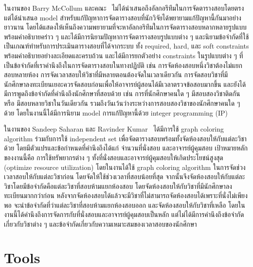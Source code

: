 ในงานของ Barry McCollum และคณะ~\cite{auto-timetable} 
ไม่ได้นำเสนอถึงอัลกอรึทึมในการจัดตารางสอบโดยตรง แต่ได้นำเสนอ model สำหรับแก้ปัญหาการจัดตารางสอบที่นักวิจัยได้พยายามแก้ปัญหานี้กันมาอย่างยาวนาน
โดยได้แสดงให้เห็นถึงความพยายามที่จะหาอัลกอริทึมในการจัดตารางสอบหลากหลายรูปแบบพร้อมคำอธิบายคร่าว ๆ และได้มีการนิยามปัญหาการจัดตารางสอบรูปแบบต่าง ๆ
และนิยามข้อจำกัดที่ใช้เป็นเกณฑ์ทำหรับการประเมินตารางสอบที่ได้จากระบบ ทั้ง required, hard, และ soft constraints พร้อมคำอธิบายอย่างละเอียดและครบถ้วน 
และได้มีการยกตัวอย่าง constraints ในรูปแบบต่าง ๆ ที่เป็นข้อจำกัดที่เราคำนึงถึงในการจัดตารางสอบในทางปฏิบัติ เช่น การจัดห้องสอบหนึ่งวิชาต้องไม่แยกสอบหลายห้อง 
การจัดเวลาสอบให้วิชาที่มีหลายตอนต้องจัดในเวลาเดียวกัน การจัดสอบวิชาที่มีนักศึกษาลงทะเบียนเยอะควรจัดสอบก่อนเพื่อให้อาจารย์ผู้สอนได้มีเวลาตรวจข้อสอบมากขึ้น และยังได้มีการพูดถึงข้อจำกัดที่คำนึงถึงนักศึกษาที่สอบด้วย เช่น การที่นักศึกษาคนใด ๆ มีสอบสองวิชาติดกัน หรือ มีสอบหลายวิชาในวันเดียวกัน 
รวมถึงวันเว้นว่างระหว่างการสอบสองวิชาของนักศึกษาคนใด ๆ ด้วย โดยในงานนี้ได้มีการนิยาม model การแก้ปัญหานี้ด้วย integer programming (IP)

ในงานของ Sandeep Saharan และ Ravinder Kumar~\cite{graphcl-idepset}
ได้มีการใช้ graph coloring algorithm ร่วมกับการใช้ independent set
เพื่อจัดตารางสอบพร้อมทั้งจัดห้องสอบให้กับแต่ละวิชาด้วย โดยมีตัวแปรและข้อกำหนดที่คำนึงถึงได้แก่ จำนวนที่นั่งสอบ และอาจารย์ผู้คุมสอบ
เป้าหมายหลักของงานนี้คือ การใช้ทรัพยากรต่าง ๆ ทั้งที่นั่งสอบและอาจารย์ผู้คุมสอบให้เกิดประโยชน์สูงสุด (optimize resource utilization)
โดยในงานได้ใช้ graph coloring algorithm ในการจัดช่วงเวลาสอบให้กับแต่ละวิชาก่อน โดยจัดให้ใช้ช่วงเวลาที่สอบน้อยที่สุด
จากนั้นจึงจัดห้องสอบให้กับแต่ละวิชาโดยมีข้อจำกัดคือแต่ละวิชาที่สอบห้ามแยกห้องสอบ โดยจัดห้องสอบให้กับวิชาที่มีนักศึกษาลงทะเบียนมากกว่าก่อน
หลังจากจัดห้องสอบได้แล้วจะมีวิชาที่ไม่สามารถจัดห้องสอบได้เพราะที่นั่งไม่เพียงพอ 
จะนำข้อจำกัดที่ว่าแต่ละวิชาที่สอบห้ามแยกห้องสอบออก และจัดห้องสอบให้กับวิชาที่เหลือ
โดยในงานนี้ได้คำนึงถึงการจัดการกับที่นั่งสอบและอาจารย์ผู้คุมสอบเป็นหลัก แต่ไม่ได้มีการคำนึงถึงข้อจำกัดเกี่ยวกับวิชาต่าง ๆ และข้อจำกัดเกี่ยวกับความเหมาะสมของเวลาสอบของนักศึกษา

\iffalse
\section{Tools}
